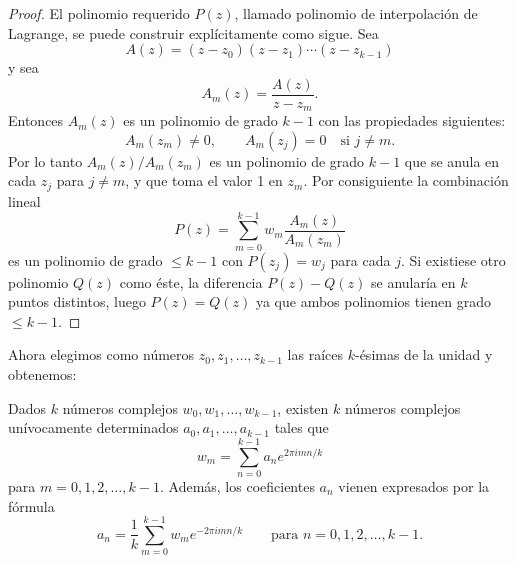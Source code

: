 \documentclass[12pt,a4paper]{book}
\begin{document}
    \begin{proof}
        El polinomio requerido $P(z)$, llamado polinomio de interpolación de Lagrange, se
        puede construir explícitamente como sigue. Sea
        \begin{equation*}
            A(z)=(z-z_{0})(z-z_{1})\cdots(z-z_{k-1})
        \end{equation*}
        y sea
        \begin{equation*}
            A_{m}(z)=\frac{A(z)}{z-z_{m}}.
        \end{equation*}
        Entonces $A_{m}(z)$ es un polinomio de grado $k-1$ con las propiedades siguientes:
        \begin{equation*}
            A_{m}(z_{m})\neq0,\qquad A_{m}(z_{j})=0\quad\text{si }j\neq m.
        \end{equation*}
        Por lo tanto $A_{m}(z)/A_{m}(z_{m})$ es un polinomio de grado $k-1$ que se anula en cada
        $z_{j}$ para $j\neq m$, y que toma el valor 1 en $z_{m}$. Por consiguiente la
        combinación lineal
        \begin{equation*}
            P(z)=\sum_{m=0}^{k-1}w_{m}\frac{A_{m}(z)}{A_{m}(z_{m})}
        \end{equation*}
        es un polinomio de grado $\leq k-1$ con $P(z_{j})=w_{j}$ para cada $j$. Si existiese
        otro polinomio $Q(z)$ como éste, la diferencia $P(z)-Q(z)$ se anularía en $k$
        puntos distintos, luego $P(z)=Q(z)$ ya que ambos polinomios tienen grado
        $\leq k-1$.
    \end{proof}

    Ahora elegimos como números $z_{0},z_{1},\dots,z_{k-1}$ las raíces $k$-ésimas de la unidad
    y obtenemos:

    \begin{teorema}
        Dados $k$ números complejos $w_{0},w_{1},\dots,w_{k-1}$, existen $k$ números complejos
        unívocamente determinados $a_{0},a_{1},\dots,a_{k-1}$ tales que
        \begin{equation}\label{eq:8-1}
            w_{m}=\sum_{n=0}^{k-1}a_{n}e^{2\pi imn/k}
        \end{equation}
        para $m=0,1,2,\dots,k-1$. Además, los coeficientes $a_{n}$ vienen expresados por la
        fórmula
        \begin{equation}\label{eq:8-2}
            a_{n}=\frac{1}{k}\sum_{m=0}^{k-1}w_{m}e^{-2\pi imn/k}\qquad\text{para }n=0,1,2,\dots,k-1.
        \end{equation}
    \end{teorema}
\end{document}
